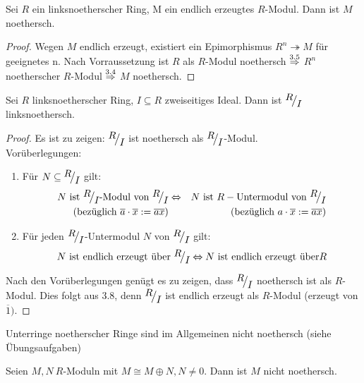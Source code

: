 \begin{bem}\label{bem3.8}
	Sei $R$ ein linksnoetherscher Ring, M ein endlich erzeugtes $R$-Modul. Dann ist $M$ noethersch. 
\end{bem}
\begin{proof}
	Wegen $M$ endlich erzeugt, existiert ein Epimorphismus $R^n \twoheadrightarrow M $ für geeignetes n. Nach Vorraussetzung ist $R$ als $R$-Modul noethersch $\overset{3.5}{\Rightarrow} $ $R^n $ noetherscher $R$-Modul $\overset{3.4}{\Rightarrow}$ $M$ noethersch.
\end{proof}
\begin{bem}\label{bem3.9}
	Sei $R$ linksnoetherscher Ring, $I \subseteq R $ zweiseitiges Ideal. Dann ist $\QR{R}{I} $ linksnoethersch.
\end{bem}
\begin{proof}
	Es ist zu zeigen: $\QR{R}{I} $ ist noethersch als $\QR{R}{I} $-Modul. \\
	Vorüberlegungen:
	\begin{enumerate}
		\item Für $N \subseteq \QR{R}{I}$ gilt:
		\begin{eqnarray*}
		N \text{ ist } \QR{R}{I} \text{-Modul von } \QR{R}{I}& \Lra & N \text{ ist } R- \text{Untermodul von } \QR{R}{I}\\
		(\text{bezüglich } \overline{a} \cdot \overline{x}:= \overline{ax}) & & (\text{bezüglich }a \cdot \overline{x} := \overline{ax})
		\end{eqnarray*}
		\item Für jeden $\QR{R}{I} $-Untermodul $N$ von $\QR{R}{I} $ gilt:
		$$ N \text{ ist endlich erzeugt über } \QR{R}{I} \Lra N \text{ ist endlich erzeugt über} R $$ 
	\end{enumerate}
	Nach den Vorüberlegungen genügt es zu zeigen, dass $\QR{R}{I}$ noethersch ist als $R$-Modul. Dies folgt aus 3.8, denn $\QR{R}{I}$ ist endlich erzeugt als $R$-Modul (erzeugt von $\overline{1}).$
\end{proof}
\begin{anm}
	Unterringe noetherscher Ringe sind im Allgemeinen nicht noethersch (siehe Übungsaufgaben)
\end{anm}
\begin{bem}\label{bem3.10}
	Seien $M,N \ R$-Moduln mit $M \cong M \oplus N, N \neq 0$. Dann ist $M$ nicht noethersch. 
\end{bem}
